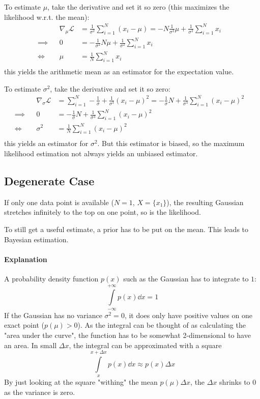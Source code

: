 				To estimate \(\mu\), take the derivative and set it so zero (this maximizes the likelihood w.r.t. the mean):
				\begin{align}
					&& \nabla_\mu \mathcal{L} &= \frac{1}{\sigma^2} \sum_{i = 1}^{N} (x_i - \mu) = -N\frac{1}{\sigma^2}\mu + \frac{1}{\sigma^2} \sum_{i = 1}^{N} x_i & \\
					\implies && 0 &= -\frac{1}{\sigma^2}N\mu + \frac{1}{\sigma^2} \sum_{i = 1}^{N} x_i & \\
					\iff && \mu &= \frac{1}{N} \sum_{i = 1}^{N} x_i  & \\
				\end{align}
				this yields the arithmetic mean as an estimator for the expectation value.

				To estimate \(\sigma^2\), take the derivative and set it so zero:
				\begin{align}
					&& \nabla_{\sigma} \mathcal{L} &= \sum_{i = 1}^{N} -\frac{1}{\sigma} + \frac{1}{\sigma^3} (x_i - \mu)^2 = -\frac{1}{\sigma}N + \frac{1}{\sigma^3} \sum_{i = 1}^{N} (x_i - \mu)^2 & \\
					\implies && 0 &= -\frac{1}{\sigma}N + \frac{1}{\sigma^3} \sum_{i = 1}^{N} (x_i - \mu)^2 & \\
					\iff && \sigma^2 &= \frac{1}{N} \sum_{i = 1}^{N} (x_i - \mu)^2 & \\
				\end{align}
				this yields an estimator for \(\sigma^2\). But this estimator is biased, so the maximum likelihood estimation not always yields an unbiased estimator.

		\subsection{Degenerate Case}
			If only one data point is available (\( N = 1 \), \( X = \{ x_1 \} \)), the resulting Gaussian stretches infinitely to the top on one point, so is the likelihood.

			To still get a useful estimate, a prior has to be put on the mean. This leads to Bayesian estimation.

			\paragraph{Explanation}
				A probability density function \( p(x) \) such as the Gaussian has to integrate to \(1\):
				\begin{equation}
					\int\limits_{-\infty}^{+\infty} p(x) \dd{x} = 1
				\end{equation}
				If the Gaussian has no variance \( \sigma^2 = 0 \), it does only have positive values on one exact point (\( p(\mu) > 0 \)). As the integral can be thought of as calculating the "area under the curve", the function has to be somewhat 2-dimensional to have an area. In small \( \Delta x \), the integral can be approximated with a square
				\begin{equation}
					\int\limits_{x}^{x + \Delta x} p(x) \dd{x} \approx p(x) \Delta x
				\end{equation}
				By just looking at the square "withing" the mean \( p(\mu) \Delta x \), the \(\Delta x\) shrinks to \(0\) as the variance is zero.

